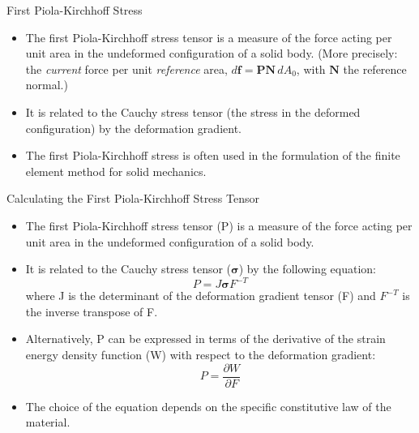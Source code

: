 \documentclass{beamer}
\begin{document}
\begin{frame}{First Piola-Kirchhoff Stress}
\begin{itemize}
\item The first Piola-Kirchhoff stress tensor is a measure of the force acting per unit area in the undeformed configuration of a solid body. (More precisely: the \emph{current} force per unit \emph{reference} area, $d\mathbf{f} = \mathbf{P}\mathbf{N}\,dA_0$, with $\mathbf{N}$ the reference normal.)
\item It is related to the Cauchy stress tensor (the stress in the deformed configuration) by the deformation gradient.
\item The first Piola-Kirchhoff stress is often used in the formulation of the finite element method for solid mechanics.
\end{itemize}
\end{frame}

\begin{frame}{Calculating the First Piola-Kirchhoff Stress Tensor}
\begin{itemize}
\item The first Piola-Kirchhoff stress tensor (P) is a measure of the force acting per unit area in the undeformed configuration of a solid body.
\item It is related to the Cauchy stress tensor ($\boldsymbol{\sigma}$) by the following equation:
\begin{equation*}
P = J \boldsymbol{\sigma} F^{-T}
\end{equation*}
where J is the determinant of the deformation gradient tensor (F) and $F^{-T}$ is the inverse transpose of F.
\item Alternatively, P can be expressed in terms of the derivative of the strain energy density function (W) with respect to the deformation gradient:
\begin{equation*}
P = \frac{\partial W}{\partial F}
\end{equation*}
\item The choice of the equation depends on the specific constitutive law of the material.
\end{itemize}
\end{frame}
\end{document}
